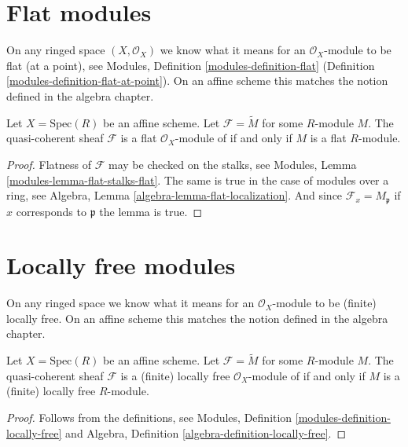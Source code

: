 \section{Flat modules}
\label{section-flat}

\noindent
On any ringed space $(X, \mathcal{O}_X)$
we know what it means for an $\mathcal{O}_X$-module
to be flat (at a point), see
Modules, Definition \ref{modules-definition-flat}
(Definition \ref{modules-definition-flat-at-point}).
On an affine scheme this matches the notion
defined in the algebra chapter.

\begin{lemma}
\label{lemma-flat-module}
Let $X = \text{Spec}(R)$ be an affine scheme.
Let $\mathcal{F} = \widetilde{M}$ for some $R$-module $M$.
The quasi-coherent sheaf $\mathcal{F}$ is a flat
$\mathcal{O}_X$-module of if and only if $M$ is a flat $R$-module.
\end{lemma}

\begin{proof}
Flatness of $\mathcal{F}$ may be checked on the stalks, see
Modules, Lemma \ref{modules-lemma-flat-stalks-flat}.
The same is true in the case of modules over a ring, see
Algebra, Lemma \ref{algebra-lemma-flat-localization}.
And since $\mathcal{F}_x = M_{\mathfrak p}$ if $x$ corresponds
to $\mathfrak p$ the lemma is true.
\end{proof}





\section{Locally free modules}
\label{section-finite-locally-free}

\noindent
On any ringed space we know what it means for an $\mathcal{O}_X$-module
to be (finite) locally free. On an affine scheme this matches the notion
defined in the algebra chapter.

\begin{lemma}
\label{lemma-locally-free-module}
Let $X = \text{Spec}(R)$ be an affine scheme.
Let $\mathcal{F} = \widetilde{M}$ for some $R$-module $M$.
The quasi-coherent sheaf $\mathcal{F}$ is a (finite) locally free
$\mathcal{O}_X$-module of if and only if $M$ is a (finite)
locally free $R$-module.
\end{lemma}

\begin{proof}
Follows from the definitions, see
Modules, Definition \ref{modules-definition-locally-free}
and
Algebra, Definition \ref{algebra-definition-locally-free}.
\end{proof}

